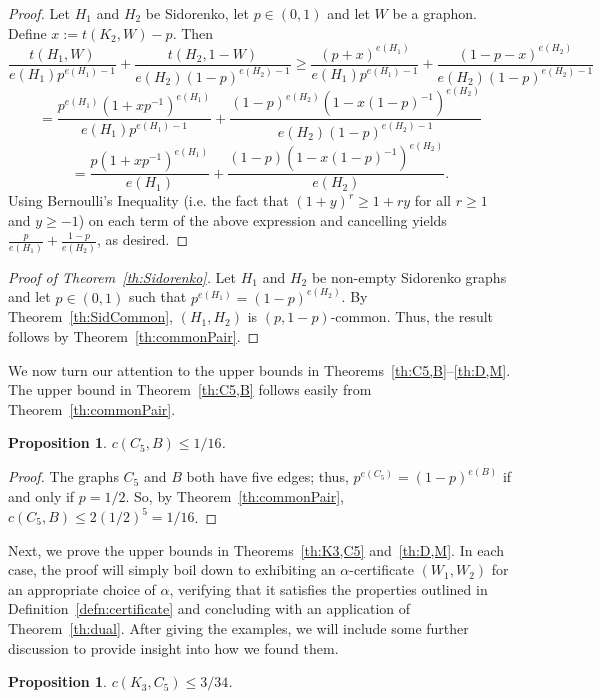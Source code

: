 \documentclass[12pt]{article}
\numberwithin{equation}{section}
\newtheorem{prop}[equation]{Proposition}
\theoremstyle{definition}
\theoremstyle{remark}
\begin{document}
\begin{proof}
Let $H_1$ and $H_2$ be Sidorenko, let $p\in (0,1)$ and let $W$ be a graphon. Define $x:=t(K_2,W)-p$. Then
\[\frac{t(H_1,W)}{e(H_1)p^{e(H_1)-1}}+\frac{t(H_2,1-W)}{e(H_2)(1-p)^{e(H_2)-1}}\geq\frac{(p+x)^{e(H_1)}}{e(H_1)p^{e(H_1)-1}}+\frac{(1-p-x)^{e(H_2)}}{e(H_2)(1-p)^{e(H_2)-1}}\]
\[=\frac{p^{e(H_1)}(1+xp^{-1})^{e(H_1)}}{e(H_1)p^{e(H_1)-1}}+\frac{(1-p)^{e(H_2)}(1-x(1-p)^{-1})^{e(H_2)}}{e(H_2)(1-p)^{e(H_2)-1}}\]
\[=\frac{p(1+xp^{-1})^{e(H_1)}}{e(H_1)}+\frac{(1-p)(1-x(1-p)^{-1})^{e(H_2)}}{e(H_2)}.\]
Using Bernoulli's Inequality (i.e. the fact that $(1+y)^r\geq 1+ry$ for all $r\geq 1$ and $y\geq-1$) on each term of the above expression and cancelling yields $\frac{p}{e(H_1)}+\frac{1-p}{e(H_2)}$, as desired.
\end{proof}

\begin{proof}[Proof of Theorem~\ref{th:Sidorenko}]
Let $H_1$ and $H_2$ be non-empty Sidorenko graphs and let $p\in (0,1)$ such that $p^{e(H_1)}=(1-p)^{e(H_2)}$. By Theorem~\ref{th:SidCommon}, $(H_1,H_2)$ is $(p,1-p)$-common. Thus, the result follows by Theorem~\ref{th:commonPair}.
\end{proof}

We now turn our attention to the upper bounds in Theorems~\ref{th:C5,B}--\ref{th:D,M}. The upper bound in Theorem~\ref{th:C5,B} follows easily from Theorem~\ref{th:commonPair}. 

\begin{prop}
\label{prop:C5,Bupper}
$c(C_5,B)\leq 1/16$.
\end{prop}

\begin{proof}
The graphs $C_5$ and $B$ both have five edges; thus, $p^{e(C_5)}=(1-p)^{e(B)}$ if and only if $p=1/2$. So, by Theorem~\ref{th:commonPair}, $c(C_5,B)\leq 2(1/2)^5=1/16$.
\end{proof}


Next, we prove the upper bounds in Theorems~\ref{th:K3,C5} and~\ref{th:D,M}. In each case, the proof will simply boil down to exhibiting an $\alpha$-certificate $(W_1,W_2)$ for an appropriate choice of $\alpha$, verifying that it satisfies the properties outlined in Definition~\ref{defn:certificate} and concluding with an application of Theorem~\ref{th:dual}. After giving the examples, we will include some further discussion to provide insight into how we found them. 


\begin{prop}
\label{prop:K3,C5upper}
$c(K_3,C_5)\leq 3/34$.
\end{prop}
\end{document}
